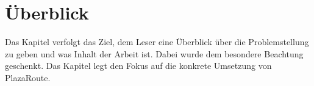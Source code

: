 \section{Überblick}
\label{sec:Überblick}
Das Kapitel  verfolgt das Ziel, dem Leser eine Überblick über die Problemstellung zu geben und was Inhalt der Arbeit ist. Dabei wurde dem  besondere Beachtung geschenkt. Das Kapitel  legt den Fokus auf die konkrete Umsetzung von PlazaRoute.